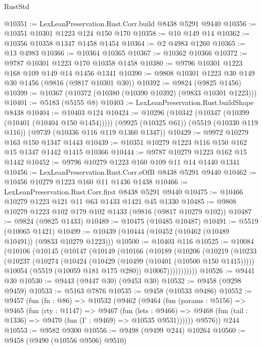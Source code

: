 \begin{lexlean}{RustStd}
\begin{coremodule}
@10351 := LexLeanPreservation.Rust.Corr.build @8438 @5291 @9440
@10356 := @10351 @10301 @1223 @124 @150 @170
@10358 := @10 @149 @14
@10362 := @10356 @10358 @1347 @1458 @1454
@10364 := @2 @4983 @1260
@10365 := @13 @4983
@10366 := @10364 @10365
@10367 := @10362 @10366
@10372 := @9787 @10301 @1223 @170 @10358 @1458
@10380 := @9796 @10301 @1223 @168 @109 @149 @14 @1456 @1341
@10390 := @9808 @10301 @1223 @30 @149 @30 @1456 (@9816 (@9817 @10301 @30))
@10392 := @9824 (@9825 @1456)
@10399 := @10367 (@10372 (@10380 (@10390 @10392) (@9833 @10301 @1223)))
@10401 := @5183 (@5155 @8)
@10403 := LexLeanPreservation.Rust.buildShape @8438
@10404 := @10403 @124
@10424 := @10296
    (@10342 (@10347 (@10399 (@10401 (@10404 @150 @1454)))))
    (@9925 (@10325 @61))
    (@5519 (@10330 @119 @116))
    (@9739 (@10336 @116 @119 @1360 @1347))
@10429 := @9972 @10279 @163 @150 @1347 @1443
@10439 := @10351 @10279 @1223 @116 @150 @162 @15 @1347 @1442 @1415 @10366
@10444 := @9787 @10279 @1223 @162 @15 @1442
@10452 := @9796 @10279 @1223 @160 @109 @11 @14 @1440 @1341
@10456 := LexLeanPreservation.Rust.Corr.eOfB @8438 @5291 @9440
@10462 := @10456 @10279 @1223 @160 @11 @1436 @1438
@10466 := LexLeanPreservation.Rust.Corr.first @8438 @5291 @9440
@10475 := @10466 @10279 @1223 @121 @11 @63 @1433 @1421 @45 @1330
@10485 := @9808 @10279 @1223 @102 @179 @102 @1433 (@9816 (@9817 @10279 @102))
@10487 := @9824 (@9825 @1433)
@10489 := @10475 (@10485 @10487)
@10491 := @5519 (@10065 @1421)
@10499 := @10439 (@10444 (@10452 (@10462 (@10489 @10491)) (@9833 @10279 @1223)))
@10500 := @10403 @116
@10525 := @10084
    (@10106
      (@10145
        (@10147
          (@10149
            (@10166
              (@10189
                (@10206
                  (@10219
                    (@10233
                      (@10237
                        (@10274
                          (@10424 (@10429 (@10499 (@10401 (@10500 @150 @1415)))))
                          @10054
                          (@5519 (@10059 @181 @175 @280))
                          @10067)))))))))))
@10526 := @9441 @30
@10530 := @9443 (@9447 @30) (@9453 @30)
@10532 := @9458 (@9298 @9459)
@10533 := @5163 @7876
@10535 := @9458 (@10533 @9486)
@10552 := @9457
    (fun (fn : @86) =>
    @10532
      (@9462
        (@9464
          (fun (params : @5156) =>
          @9465
            (fun (rty : @1147) =>
            @9467
              (fun (lets : @9466) =>
              @9468 (fun (tail : @1336) => @9470 (fun (Γ : @9469) => @10535 @9531))))))
        @9576))
    @244
@10553 := @9582 @9300
@10556 := @9498 (@9499 @244) @10264
@10560 := @9458 (@9490 (@10556 @9506) @9510)

\end{coremodule}
\end{lexlean}

